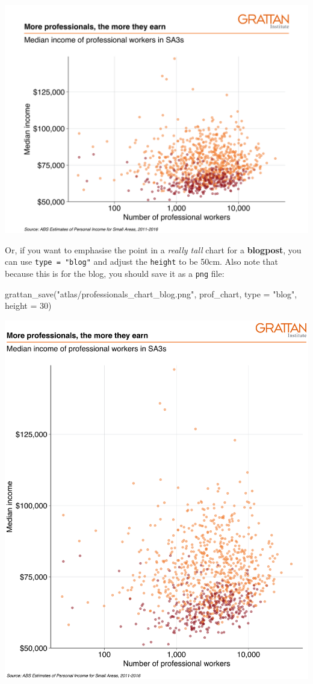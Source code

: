 \documentclass[
]{book}
\newenvironment{Shaded}{\begin{snugshade}}{\end{snugshade}}
\newcommand{\AttributeTok}[1]{\textcolor[rgb]{0.77,0.63,0.00}{#1}}
\newcommand{\DecValTok}[1]{\textcolor[rgb]{0.00,0.00,0.81}{#1}}
\newcommand{\FunctionTok}[1]{\textcolor[rgb]{0.00,0.00,0.00}{#1}}
\newcommand{\NormalTok}[1]{#1}
\newcommand{\StringTok}[1]{\textcolor[rgb]{0.31,0.60,0.02}{#1}}
\begin{document}
\includegraphics{atlas/professionals_chart_presentation.png}

Or, if you want to emphasise the point in a \emph{really tall} chart for a \textbf{blogpost}, you can use \texttt{type\ =\ "blog"} and adjust the \texttt{height} to be 50cm. Also note that because this is for the blog, you should save it as a \texttt{png} file:

\begin{Shaded}
\begin{Highlighting}[]
\FunctionTok{grattan\_save}\NormalTok{(}\StringTok{"atlas/professionals\_chart\_blog.png"}\NormalTok{, prof\_chart, }
             \AttributeTok{type =} \StringTok{"blog"}\NormalTok{, }\AttributeTok{height =} \DecValTok{30}\NormalTok{)}
\end{Highlighting}
\end{Shaded}

\includegraphics{atlas/professionals_chart_blog.png}
\end{document}
